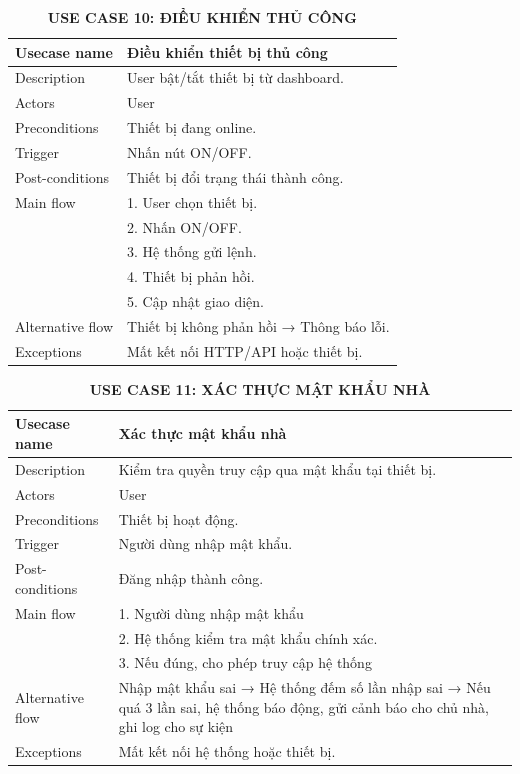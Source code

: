 \begin{table}[H]
\centering
\caption*{\textbf{USE CASE 10: ĐIỀU KHIỂN THỦ CÔNG}}
\renewcommand{\arraystretch}{1.3}
\begin{tabular}{|p{4cm}|p{11cm}|}
\hline
Usecase name & Điều khiển thiết bị thủ công \\
\hline
Description & User bật/tắt thiết bị từ dashboard. \\
\hline
Actors & User \\
\hline
Preconditions & Thiết bị đang online. \\
\hline
Trigger & Nhấn nút ON/OFF. \\
\hline
Post-conditions & Thiết bị đổi trạng thái thành công. \\
\hline
Main flow &
1. User chọn thiết bị.\\ &
2. Nhấn ON/OFF.\\ &
3. Hệ thống gửi lệnh.\\ &
4. Thiết bị phản hồi.\\ &
5. Cập nhật giao diện. \\
\hline
Alternative flow & Thiết bị không phản hồi → Thông báo lỗi. \\
\hline
Exceptions & Mất kết nối HTTP/API hoặc thiết bị. \\
\hline
\end{tabular}
\end{table}
\begin{table}[H]
\centering
\caption*{\textbf{USE CASE 11: XÁC THỰC MẬT KHẨU NHÀ}}
\renewcommand{\arraystretch}{1.3}
\begin{tabular}{|p{4cm}|p{11cm}|}
\hline
Usecase name & Xác thực mật khẩu nhà \\
\hline
Description & Kiểm tra quyền truy cập qua mật khẩu tại thiết bị. \\
\hline
Actors & User \\
\hline
Preconditions & Thiết bị hoạt động. \\
\hline
Trigger & Người dùng nhập mật khẩu. \\
\hline
Post-conditions & Đăng nhập thành công. \\
\hline
Main flow &
1. Người dùng nhập mật khẩu\\ &
2. Hệ thống kiểm tra mật khẩu chính xác. \\ &
3. Nếu đúng, cho phép truy cập hệ thống\\ 
\hline
Alternative flow & Nhập mật khẩu sai → Hệ thống đếm số lần nhập sai → Nếu quá 3 lần sai, hệ thống báo động, gửi cảnh báo cho chủ nhà, ghi log cho sự kiện \\
\hline
Exceptions & Mất kết nối hệ thống hoặc thiết bị.  \\
\hline
\end{tabular}
\end{table}
